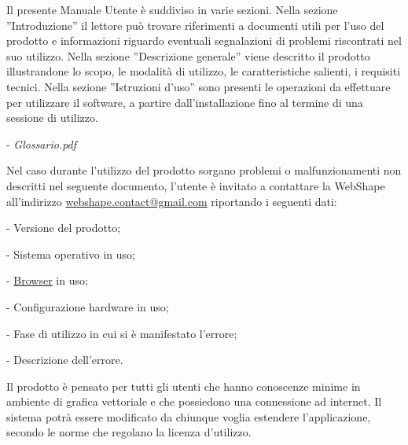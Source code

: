  
\newpage
\thispagestyle{fancy}
\tableofcontents
\thispagestyle{fancy}
\newpage
 
 
Il presente Manuale Utente \`e suddiviso in varie sezioni. Nella sezione ''Introduzione'' il lettore pu\`o trovare riferimenti a documenti utili per l'uso del prodotto e informazioni riguardo eventuali segnalazioni di problemi riscontrati nel suo utilizzo.
Nella sezione ''Descrizione generale'' viene descritto il prodotto illustrandone lo scopo, le modalit\`a di utilizzo, le caratteristiche salienti, i requisiti tecnici. Nella sezione ''Istruzioni d'uso'' sono presenti le operazioni da effettuare per utilizzare il software, a partire dall'installazione fino al termine di una sessione di utilizzo.\\ %
 
 
\begin{elencopuntato}[\normindent]
  \item[-] \textit{Glossario.pdf}
\end{elencopuntato}
 
Nel caso durante l'utilizzo del prodotto sorgano problemi o malfunzionamenti non descritti nel seguente documento, l'utente \`e invitato a contattare la WebShape all'indirizzo \href{mailto:webshape.contact@gmail.com}{webshape.contact@gmail.com} riportando i seguenti dati:\\
\begin{elencopuntato}[\normindent]
  \item[-] Versione del prodotto;
  \item[-] Sistema operativo in uso;
  \item[-] \underline{Browser} in uso;
  \item[-] Configurazione hardware in uso;
  \item[-] Fase di utilizzo in cui si \`e manifestato l'errore;
  \item[-] Descrizione dell'errore.
\end{elencopuntato}
 

Il prodotto \`e pensato per tutti gli utenti che hanno conoscenze minime in ambiente di grafica vettoriale e che possiedono una connessione ad internet. Il sistema potr\`a essere modificato da chiunque voglia estendere l'applicazione, secondo le norme che regolano la licenza d'utilizzo.\\
 
